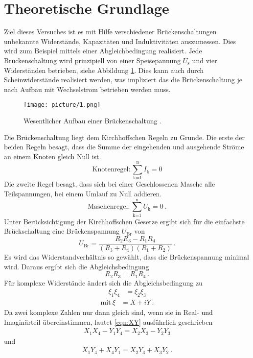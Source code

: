 \section{Theoretische Grundlage}
\label{sec:Theorie}

Ziel dieses Versuches ist es mit Hilfe verschiedener Brückenschaltungen unbekannte Widerstände, Kapazitäten und Induktivitäten auszumessen. Dies wird zum Beispiel mittels einer Abgleichbedingung realisiert.
Jede Brückenschaltung wird prinzipiell von einer Speisepannung $U_\text{s}$ und vier Widerständen betrieben, siehe Abbildung \ref{fig:wheatstone}. Dies kann auch durch Scheinwiderstände realisiert werden, was impliziert das die Brückenschaltung je nach Aufbau mit Wechselstrom betrieben werden muss.
\begin{figure}[H]
	\centering
	\texttt{[image: picture/1.png]}
	\caption{Wesentlicher Aufbau einer Brückenschaltung \cite{sample}.}
	\label{fig:wheatstone}
\end{figure}
Die Brückenschaltung liegt dem Kirchhoffschen Regeln zu Grunde. Die erste der beiden Regeln besagt, dass die Summe der eingehenden und ausgehende Ströme an einem Knoten gleich Null ist.
\begin{equation}
  \text{Knotenregel} : \sum_{\text{k=1}}^\text{n} I_\text{k} = 0
  \label{eqn:K1}
\end{equation}
Die zweite Regel besagt, dass sich bei einer Geschlossenen Masche alle Teilspannungen, bei einem Umlauf zu Null addieren.
\begin{equation}
  \text{Maschenregel} : \sum_{\text{k=1}}^\text{n} U_\text{k} = 0 \ .
  \label{eqn:K2}
\end{equation}
Unter Berücksichtigung der Kirchhoffschen Gesetze ergibt sich für die einfachste Brückschaltung eine Brückenspannung $U_\text{Br}$ von
\begin{equation}
  U_\text{Br} = \frac{R_2 R_3 - R_1 R_4}{(R_3 + R_4)(R_1 + R_2)} \ .
  \label{eqn:Ubr}
\end{equation}
Es wird das Widerstandverhältnis so gewählt, dass die Brückenspannung minimal wird. Daraus ergibt sich die Abgleichsbedingung
\begin{equation}
  R_2 R_3 = R_1 R_4 \ .
  \label{eqn:R}
\end{equation}
Für komplexe Widerstände ändert sich die Abgleichsbedingung zu
\begin{align}
	\xi_1 \xi_4 & = \xi_2 \xi_3
	\label{eqn:XY}
\end{align}
\begin{align*}
		\text{mit} \ \xi & = X + iY \ .
\end{align*}
Da zwei komplexe Zahlen nur dann gleich sind, wenn sie in Real- und Imaginärteil übereinstimmen, lautet \ref{eqn:XY} ausführlich geschrieben
\begin{align}
	X_1 X_4 - Y_1 Y_4 = X_2 X_3 - Y_2 Y_3
	\label{eqn:XY1}
\end{align}
und
\begin{align}
	X_1 Y_4 + X_4 Y_1 = X_2 Y_3 + X_3 Y_2 \ .
	\label{eqn:XY2}
\end{align}

